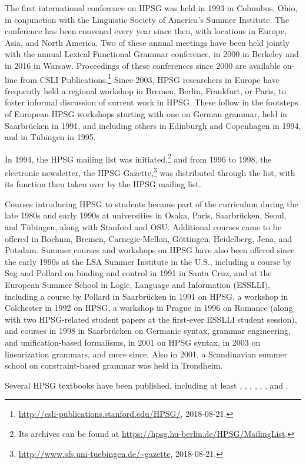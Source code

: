 \documentclass[output=paper]{langsci/langscibook}
\begin{document}
The first international conference on HPSG was held in 1993 in Columbus, Ohio, in conjunction with the Linguistic Society of America's Summer Institute.  The conference has been convened every year since then, with locations in Europe, Asia, and North America.  Two of these annual meetings have been held jointly with the annual Lexical Functional Grammar conference, in 2000 in Berkeley and in 2016 in Warsaw.  Proceedings of these conferences since 2000 are available on-line from CSLI Publications.\footnote{\url{http://csli-publications.stanford.edu/HPSG/}, 2018-08-21.}  Since 2003, HPSG researchers in Europe have frequently held a regional workshop in Bremen, Berlin, Frankfurt, or Paris, to foster informal discussion of current work in HPSG.  These follow in the footsteps of European HPSG workshops starting with one on German grammar, held in Saarbr{\"u}cken in 1991, and including others in Edinburgh and Copenhagen in 1994, and in T{\"u}bingen in 1995.

In 1994, the HPSG mailing list was initiated,\footnote{Its archives can be found at \url{https://hpsg.hu-berlin.de/HPSG/MailingList}.} and from 1996 to 1998, the electronic newsletter, the HPSG Gazette,\footnote{\url{http://www.sfs.uni-tuebingen.de/~gazette}, 2018-08-21.} was distributed through the list, with its function then taken over by the HPSG mailing list.

Courses introducing HPSG to students became part of the curriculum during the late 1980s and early 1990s at universities in Osaka, Paris, Saarbr{\"u}cken, Seoul, and T{\"u}bingen, along with Stanford and OSU.  Additional courses came to be offered in Bochum, Bremen, Carnegie-Mellon, G{\"o}ttingen, Heidelberg, Jena, and Potsdam.  Summer courses and workshops on HPSG have also been offered since the early 1990s at the LSA Summer Institute in the U.S., including a course by Sag and Pollard on binding and control in 1991 in Santa Cruz, and at the European Summer School in Logic, Language and Information (ESSLLI), including a course by Pollard in Saarbr{\"u}cken in 1991 on HPSG, a workshop in Colchester in 1992 on HPSG, a workshop in Prague in 1996 on Romance (along with two HPSG-related student papers at the first-ever ESSLLI student session), and courses in 1998 in Saarbr{\"u}cken on Germanic syntax, grammar engineering, and unification-based formalisms, in 2001 on HPSG syntax, in 2003 on linearization grammars, and more since.  Also in 2001, a Scandinavian summer school on constraint-based grammar was held in Trondheim.

Several HPSG textbooks have been published, including at least \citet{Borsley91a,Borsley96a-u}, \citet{SagW99a-Short}, \citet*{SWB2003a},
\citeauthor{MuellerLehrbuch1} \citeyear*{MuellerLehrbuch1,MuellerGTBuch2-linked},
\citet{MuellerGT-Eng1}, \citet{Kim2016a-u}, and \citet{Levine2017a-u}.
\end{document}
